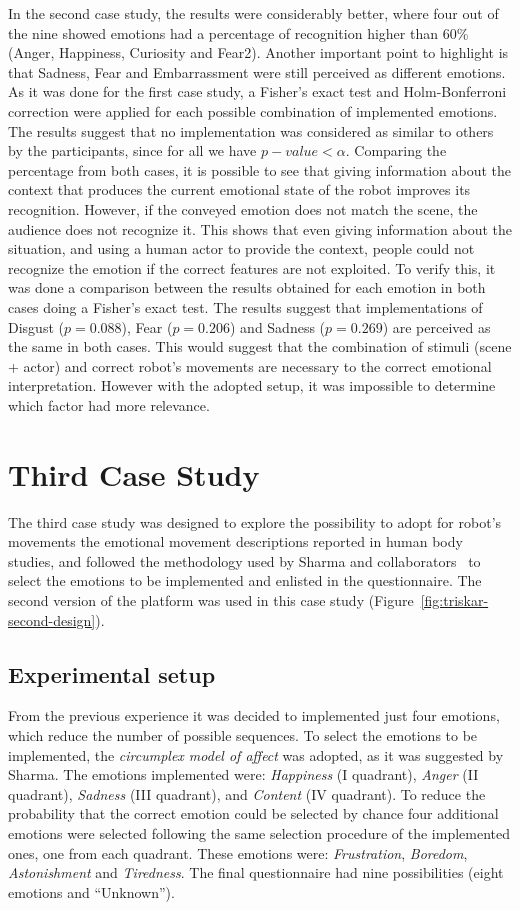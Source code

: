 In the second case study, the results were considerably better, where four out of the nine showed emotions had a percentage of recognition higher than 60\% (Anger, Happiness, Curiosity and Fear2). Another important point to highlight is that Sadness, Fear and Embarrassment were still perceived as different emotions. As it was done for the first case study, a Fisher's exact test and Holm-Bonferroni correction were applied for each possible combination of implemented emotions. The results suggest that no implementation was considered as similar to others by the participants, since for all we have $p-value<\alpha$.  Comparing the percentage from both cases, it is possible to see that giving information about the context that produces the current emotional state of the robot improves its recognition. However, if the conveyed emotion does not match the scene, the audience does not recognize it. This shows that even giving information about the situation, and using a human actor to provide the context, people could not recognize the emotion if the correct features are not exploited. To verify this, it was done a comparison between the results obtained for each emotion in both cases doing a Fisher's exact test. The results suggest that implementations of Disgust ($p=0.088$), Fear ($p=0.206$) and Sadness ($p=0.269$) are perceived as the same in both cases. This would suggest that the combination of stimuli (scene + actor) and correct robot's movements are necessary to the correct emotional interpretation. However with the adopted setup, it was impossible to determine which factor had more relevance.
\section{Third Case Study}
The third case study was designed to explore the possibility to adopt for robot's movements the emotional movement descriptions reported in human body studies, and followed the methodology used by Sharma and collaborators~\cite{Sharma2013} to select the emotions to be implemented and enlisted in the questionnaire. The second version of the platform was used in this case study (Figure~\ref{fig:triskar-second-design}).
\subsection{Experimental setup}
From the previous experience it was decided to implemented just four emotions, which reduce the number of possible sequences. To select the emotions to be implemented, the \textit{circumplex model of affect} was adopted, as it was suggested by Sharma. The emotions implemented were: \textit{Happiness} (I quadrant), \textit{Anger} (II quadrant), \textit{Sadness} (III quadrant), and \textit{Content} (IV quadrant). To reduce the probability that the correct emotion could be selected by chance four additional emotions were selected following the same selection procedure of the implemented ones, one from each quadrant. These emotions were: \textit{Frustration}, \textit{Boredom}, \textit{Astonishment} and \textit{Tiredness}. The final questionnaire had nine possibilities (eight emotions and ``Unknown''). 

